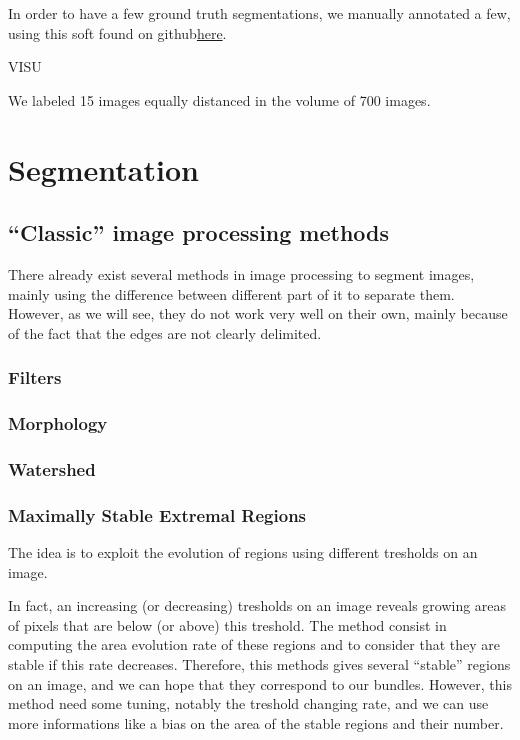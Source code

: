 \documentclass{report}
\begin{document}
In order to have a few ground truth segmentations, we manually annotated a few, using this soft found on github\href{https://github.com/wkentaro/labelme}{here}.

VISU

We labeled 15 images equally distanced in the volume of 700 images.

\chapter{Segmentation}

\section{"`Classic"' image processing methods}

There already exist several methods in image processing to segment images, mainly using the difference between different part of it to separate them.   
However, as we will see, they do not work very well on their own, mainly because of the fact that the edges are not clearly delimited.

\subsection{Filters}
\subsection{Morphology}
\subsection{Watershed}
\subsection{Maximally Stable Extremal Regions}

The idea is to exploit the evolution of regions using different tresholds on an image. \newline

In fact, an increasing (or decreasing) tresholds on an image reveals growing areas of pixels that are below (or above) this treshold. The method consist in computing the area evolution rate of these regions and to consider that they are stable if this rate decreases. Therefore, this methods gives several "`stable"' regions on an image, and we can hope that they correspond to our bundles.  
However, this method need some tuning, notably the treshold changing rate, and we can use more informations like a bias on the area of the stable regions and their number.
\end{document}
